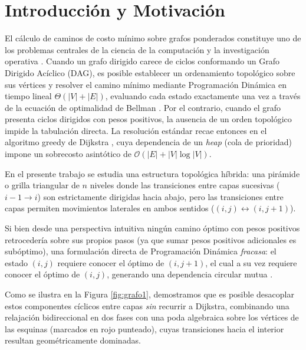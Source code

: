 \section{Introducción y Motivación}

El cálculo de caminos de costo mínimo sobre grafos ponderados constituye uno de los problemas centrales de la ciencia de la computación y la investigación operativa \parencite{cormen2022, kleinberg2005}. Cuando un grafo dirigido carece de ciclos conformando un Grafo Dirigido Acíclico (DAG), es posible establecer un ordenamiento topológico sobre sus vértices y resolver el camino mínimo mediante Programación Dinámica en tiempo lineal $\Theta(|V| + |E|)$, evaluando cada estado exactamente una vez a través de la ecuación de optimalidad de Bellman \parencite{bellman1957}. Por el contrario, cuando el grafo presenta ciclos dirigidos con pesos positivos, la ausencia de un orden topológico impide la tabulación directa. La resolución estándar recae entonces en el algoritmo greedy de Dijkstra \parencite{dijkstra1959}, cuya dependencia de un \textit{heap} (cola de prioridad) impone un sobrecosto asintótico de $\mathcal{O}(|E| + |V| \log |V|)$.

\vspace{1ex}
\noindent
\begin{minipage}[c]{0.55\textwidth}
\justifying
En el presente trabajo se estudia una estructura topológica híbrida: una pirámide o grilla triangular de $n$ niveles donde las transiciones entre capas sucesivas ($i-1 \to i$) son estrictamente dirigidas hacia abajo, pero las transiciones entre capas permiten movimientos laterales en ambos sentidos ($(i,j) \leftrightarrow (i,j+1)$). 

Si bien desde una perspectiva intuitiva ningún camino óptimo con pesos positivos retrocedería sobre sus propios pasos (ya que sumar pesos positivos adicionales es subóptimo), una formulación directa de Programación Dinámica \textit{fracasa}: el estado $(i,j)$ requiere conocer el óptimo de $(i,j+1)$, el cual a su vez requiere conocer el óptimo de $(i,j)$, generando una dependencia circular mutua \parencite{buchwald2026}.

Como se ilustra en la Figura \ref{fig:grafo1}, demostramos que es posible desacoplar estos componentes cíclicos entre capas \textit{sin} recurrir a Dijkstra, combinando una relajación bidireccional en dos fases con una poda algebraica sobre los vértices de las esquinas (marcados en rojo punteado), cuyas transiciones hacia el interior resultan geométricamente dominadas.
\end{minipage}%
\hfill%
\begin{minipage}[c]{0.41\textwidth}
    \centering
    \shorthandoff{><}
    
    \shorthandon{><}
    \label{fig:grafo1}
\end{minipage}

